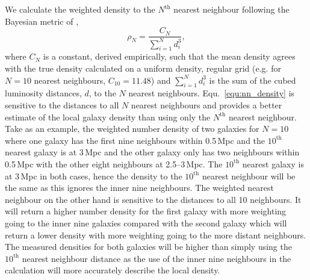 \documentclass[fleqn,usenatbib]{mnras}
\begin{document}
We calculate the weighted density to the $N^{\mathrm{th}}$ nearest neighbour following the Bayesian metric of \cite{Cowan2008},
\begin{equation}
	\displaystyle \rho_N=\frac{C_N}{\sum_{i=1}^N d_i^3},
	\label{equ:nn_density}
\end{equation}
where $C_N$ is a constant, derived empirically, such that the mean density agrees with the true density calculated on a uniform density, regular grid (e.g. for $N=10$ nearest neighbours, $C_{10}=11.48$) and $\sum_{i=1}^N d_i^3$ is the sum of the cubed luminosity distances, $d$, to the $N$ nearest neighbours. Equ.~\ref{equ:nn_density} is sensitive to the distances to all $N$ nearest neighbours and provides a better estimate of the local galaxy density than using only the $N^{\mathrm{th}}$ nearest neighbour. Take as an example, the weighted number density of two galaxies for $N=10$ where one galaxy has the first nine neighbours within 0.5\,Mpc and the $10^{\mathrm{th}}$ nearest galaxy is at 3\,Mpc and the other galaxy only has two neighbours within 0.5\,Mpc with the other eight neighbours at 2.5--3\,Mpc. The $10^{\mathrm{th}}$ nearest galaxy is at 3\,Mpc in both cases, hence the density to the $10^{\mathrm{th}}$ nearest neighbour will be the same as this ignores the inner nine neighbours. The weighted nearest neighbour on the other hand is sensitive to the distances to all 10 neighbours. It   will return a higher number density for the first galaxy with more weighting going to the inner nine galaxies compared with the second galaxy which will return a lower density with more weighting going to the more distant neighbours. The measured densities for both galaxies will be higher than simply using the $10^{\mathrm{th}}$ nearest neighbour distance as the use of the inner nine neighbours in the calculation will more accurately describe the local density.
\end{document}

